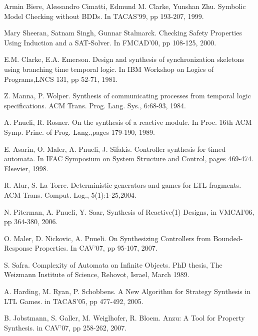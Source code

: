 \documentclass[journal]{IEEEtran}
\begin{document}
\begin{thebibliography}{1}
Armin Biere, Alessandro Cimatti, Edmund M. Clarke, Yunshan Zhu.
Symbolic Model Checking without BDDs.
In TACAS'99,
pp 193-207,
1999.

Mary Sheeran, Satnam Singh, Gunnar Stalmarck.
Checking Safety Properties Using Induction and a SAT-Solver.
In FMCAD'00,
pp 108-125,
2000.


E.M. Clarke, E.A. Emerson.
Design and synthesis of synchronization skeletons using branching time temporal logic.
In IBM Workshop on Logics of Programs,LNCS 131,
pp 52-71,
1981.

Z. Manna, P. Wolper.
Synthesis of communicating processes from temporal logic specifications.
ACM Trans. Prog. Lang. Sys., 6:68-93, 1984.

A. Pnueli, R. Rosner.
On the synthesis of a reactive module.
In Proc. 16th ACM Symp. Princ. of Prog. Lang.,pages 179-190, 1989.

E. Asarin, O. Maler, A. Pnueli, J. Sifakis.
Controller synthesis for timed automata.
In IFAC Symposium on System Structure and Control, pages 469-474. Elsevier, 1998.

R. Alur, S. La Torre.
Deterministic generators and games for LTL fragments.
ACM Trans. Comput. Log., 5(1):1-25,2004.

N. Piterman, A. Pnueli, Y. Saar,
Synthesis of Reactive(1) Designs,
in VMCAI'06,
pp 364-380,
2006.

O. Maler, D. Nickovic, A. Pnueli.
On Synthesizing Controllers from Bounded-Response Properties.
In CAV'07,
pp 95-107,
2007.

S. Safra.
Complexity of Automata on Infinite Objects.
PhD thesis, The Weizmann Institute of Science, Rehovot, Israel, March 1989.

A. Harding, M. Ryan, P. Schobbens.
A New Algorithm for Strategy Synthesis in LTL Games.
in TACAS'05,
pp 477-492,
2005.

B. Jobstmann, S. Galler, M. Weiglhofer, R. Bloem.
Anzu: A Tool for Property Synthesis.
in CAV'07,
pp 258-262,
2007.




\end{thebibliography}
\end{document}
